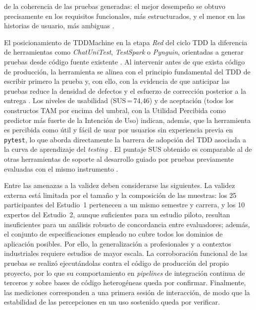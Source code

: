 \documentclass[10pt,journal,twoside,letterpaper]{IEEEtran}
\begin{document}
de la coherencia de las pruebas generadas: el mejor desempeño se obtuvo precisamente en los requisitos funcionales, más estructurados, y el menor en las historias de usuario, más ambiguas \cite{wang2024survey,yang2024evaluation}.
    
    El posicionamiento de TDDMachine en la etapa \emph{Red} del ciclo TDD la diferencia de herramientas como \emph{ChatUniTest}, \emph{TestSpark} o \emph{Pynguin}, orientadas a generar pruebas desde código fuente existente \cite{chen2024chatunitest,sapozhnikov2024testspark,lukasczyk2022pynguin}. Al intervenir antes de que exista código de producción, la herramienta se alinea con el principio fundamental del TDD de escribir primero la prueba y, con ello, con la evidencia de que anticipar las pruebas reduce la densidad de defectos y el esfuerzo de corrección posterior a la entrega \cite{nagappan2008tdd,rafique2013meta,erdogmus2005testfirst}. Los niveles de usabilidad (SUS\,=\,74,46) y de aceptación (todos los constructos TAM por encima del umbral, con la Utilidad Percibida como predictor más fuerte de la Intención de Uso) indican, además, que la herramienta es percibida como útil y fácil de usar por usuarios sin experiencia previa en \texttt{pytest}, lo que aborda directamente la barrera de adopción del TDD asociada a la curva de aprendizaje del \emph{testing} \cite{ghafari2020inconclusive,bangor2009sus,davis1989tam}. El puntaje SUS obtenido es comparable al de otras herramientas de soporte al desarrollo guiado por pruebas previamente evaluadas con el mismo instrumento \cite{guerrero2025tddtool}.
    
    Entre las amenazas a la validez deben considerarse las siguientes. La validez externa está limitada por el tamaño y la composición de las muestras: los 25 participantes del Estudio~1 pertenecen a un mismo semestre y carrera, y los 10 expertos del Estudio~2, aunque suficientes para un estudio piloto, resultan insuficientes para un análisis robusto de concordancia entre evaluadores; además, el conjunto de especificaciones empleado no cubre todos los dominios de aplicación posibles. Por ello, la generalización a profesionales y a contextos industriales requiere estudios de mayor escala. La corroboración funcional de las pruebas se realizó ejecutándolas contra el código de producción del propio proyecto, por lo que su comportamiento en \emph{pipelines} de integración continua de terceros y sobre bases de código heterogéneas queda por confirmar. Finalmente, las mediciones corresponden a una primera sesión de interacción, de modo que la estabilidad de las percepciones en un uso sostenido queda por verificar.
    
\end{document}
